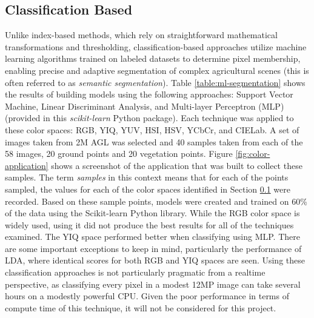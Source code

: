 \documentclass[letterpaper]{report}
\begin{document}
{\subsection{Classification Based}
\label{section:classification}
Unlike index-based methods, which rely on straightforward mathematical transformations and thresholding, classification-based approaches utilize machine learning algorithms trained on labeled datasets to determine pixel membership, enabling precise and adaptive segmentation of complex agricultural scenes (this is often referred to as \textit{semantic segmentation}). Table \ref{table:ml-segmentation} shows the results of building models using the following approaches:  Support Vector Machine, Linear Discriminant Analysis, and Multi-layer Perceptron (MLP) (provided in this \textit{scikit-learn} Python package). Each technique was applied to these color spaces: RGB, YIQ, YUV, HSI, HSV, YCbCr, and CIELab. A set of images taken from 2M AGL was selected and 40 samples taken from each of the 58 images, 20 ground points and 20 vegetation points. Figure \ref{fig:color-application} shows a screenshot of the application that was built to collect these samples. The term \textit{samples} in this context means that for each of the points sampled, the values for each of the color spaces identified in Section \ref{section:classification} were recorded. Based on these sample points, models were created and trained on 60\% of the data using the Scikit-learn Python library. While the RGB color space is widely used, using it did not produce the best results for all of the techniques examined. The YIQ space performed better when classifying using MLP. There are some important exceptions to keep in mind, particularly the performance of LDA, where identical scores for both RGB and YIQ spaces are seen. Using these classification approaches is not particularly pragmatic from a realtime perspective, as classifying every pixel in a modest 12MP image can take several hours on a modestly powerful CPU. Given the poor performance in terms of compute time of this technique, it will not be considered for this project.

}
\end{document}
